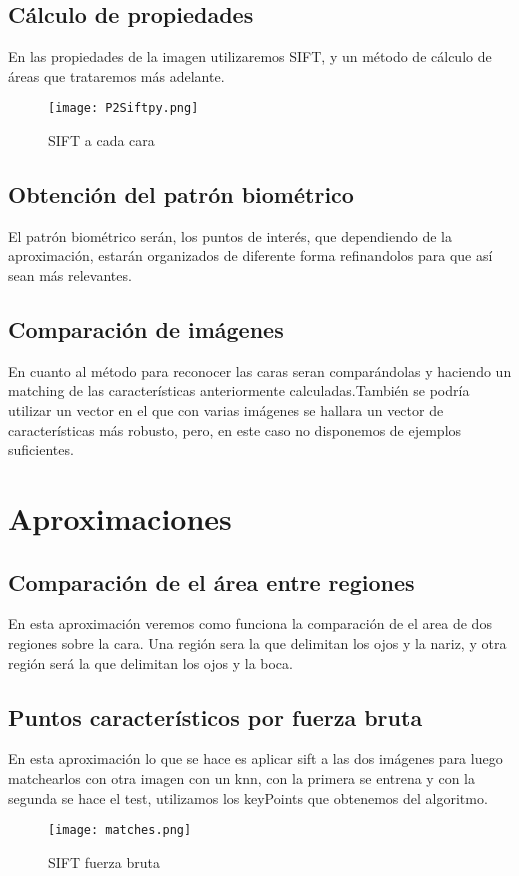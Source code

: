 \documentclass[12pt,a4paper]{article}
\begin{document}
\subsection{Cálculo de propiedades}
En las propiedades de la imagen utilizaremos SIFT, y un método de cálculo de áreas que trataremos más adelante.
\begin{figure}[H]
\centering
\texttt{[image: P2Siftpy.png]}
\caption{SIFT a cada cara}
\end{figure}
\subsection{Obtención del patrón biométrico}
El patrón biométrico serán, los puntos de interés, que dependiendo de la aproximación, estarán organizados de diferente forma refinandolos para que así sean más relevantes.
\subsection{Comparación de imágenes}
En cuanto al método para reconocer las caras seran comparándolas y haciendo un matching de las características anteriormente calculadas.También se podría utilizar un vector en el que con varias imágenes se hallara un vector de características más robusto, pero, en este caso no disponemos de ejemplos suficientes.
\section{Aproximaciones}
\subsection{Comparación de el área entre regiones}
En esta aproximación veremos como funciona la comparación de el area de dos regiones sobre la cara. Una región sera la que delimitan los ojos y la nariz, y otra región será la que delimitan los ojos y la boca.
\subsection{Puntos característicos por fuerza bruta}
En esta aproximación lo que se hace es aplicar sift a las dos imágenes para luego matchearlos con otra imagen con un knn, con la primera se entrena y con la segunda se hace el test, utilizamos los keyPoints que obtenemos del algoritmo.
\begin{figure}[H]
\centering
\texttt{[image: matches.png]}
\caption{SIFT fuerza bruta}
\end{figure}
\end{document}
